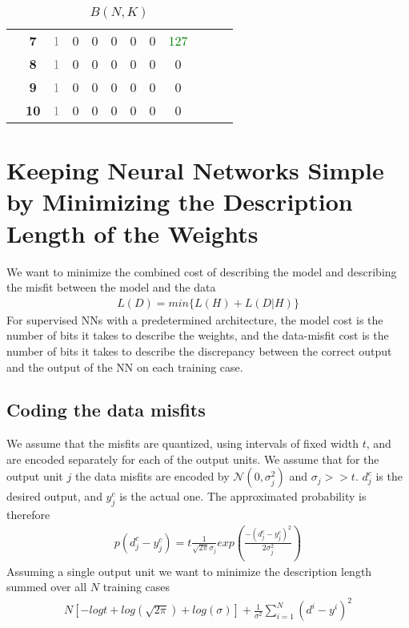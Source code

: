 \documentclass[class=article, crop=false]{standalone}
\numberwithin{equation}{section}
\begin{document}
\begin{table}[ht]
\begin{tabular}{c|c||*{10}{c|}}
    \cline{2-9}
&    \bfseries 7  & \textcolor{gray}{1}   & 0   & 0   & 0   & 0   & 0    & \textcolor{green}{127}\\

    \cline{2-9}
&    \bfseries 8  & \textcolor{gray}{1}   & 0   & 0   & 0   & 0   & 0   & 0\\

    \cline{2-9}
&    \bfseries 9  & \textcolor{gray}{1}   & 0   & 0   & 0   & 0   & 0   & 0\\

    \cline{2-9}
&    \bfseries 10 & \textcolor{gray}{1}   & 0   & 0   & 0   & 0   & 0   & 0\\

    \cline{2-9}
  \end{tabular}
  \caption{$B(N, K)$}
\end{table} 




\section{Keeping Neural Networks Simple by Minimizing
the Description Length of the Weights}
We want to minimize the combined cost of describing the model and describing the misfit between the model and the data
\begin{align}
    L(D)=min\{ L(H) + L(D|H) \}
\end{align}
For supervised NNs with a predetermined architecture, the model cost is the number of bits it takes to describe the weights, and the data-misfit cost is the number of bits it takes to describe the discrepancy between the correct output and the output of the NN on each training case.
\subsection{Coding the data misfits}
We assume that the misfits are quantized, using intervals of fixed width $t$, and are encoded separately for each of the output units. We assume that for the output unit $j$ the data misfits are encoded by $\mathcal{N}(0, \sigma_j^2)$ and $\sigma_j>>t$. $d_j^c$ is the desired output, and $y_j^c$ is the actual one. The approximated probability is therefore
\begin{align}
    p(d_j^c-y_j^c)=t\frac{1}{\sqrt{2\pi}\sigma_j}exp(\frac{-(d_j^c-y_j^c)^2}{2\sigma_j^2})
\end{align}
 Assuming a single output unit we want to minimize the description length summed over all $N$ training cases
\begin{align}
    N[-logt + log(\sqrt{2\pi}) + log(\sigma)]+\frac{1}{\sigma^2}\sum\limits_{i=1}^N (d^i-y^i)^2
\end{align}\label{eqn:misfits-raw-bit}
\end{document}
